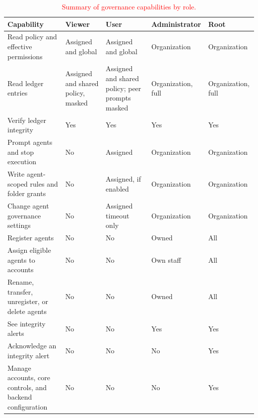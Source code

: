 \begin{table}[htbp]
\centering
\footnotesize
\caption{\textcolor{red}{Summary of governance capabilities by role.}}
\label{tab:gov-role-capabilities}
\color{red}
\renewcommand{\arraystretch}{1.2}
\begin{tabular}{@{}>{\raggedright\arraybackslash}p{}
>{\raggedright\arraybackslash}p{}
>{\raggedright\arraybackslash}p{}
>{\raggedright\arraybackslash}p{}
>{\raggedright\arraybackslash}p{}@{}}
\toprule
Capability & Viewer & User & Administrator & Root \\
\midrule
Read policy and effective permissions & Assigned and global & Assigned and global & Organization & Organization \\
Read ledger entries & Assigned and shared policy, masked & Assigned and shared policy; peer prompts masked & Organization, full & Organization, full \\
Verify ledger integrity & Yes & Yes & Yes & Yes \\
Prompt agents and stop execution & No & Assigned & Organization & Organization \\
Write agent-scoped rules and folder grants & No & Assigned, if enabled & Organization & Organization \\
Change agent governance settings & No & Assigned timeout only & Organization & Organization \\
Register agents & No & No & Owned & All \\
Assign eligible agents to accounts & No & No & Own staff & All \\
Rename, transfer, unregister, or delete agents & No & No & Owned & All \\
See integrity alerts & No & No & Yes & Yes \\
Acknowledge an integrity alert & No & No & No & Yes \\
Manage accounts, core controls, and backend configuration & No & No & No & Yes \\
\bottomrule
\end{tabular}
\end{table}

